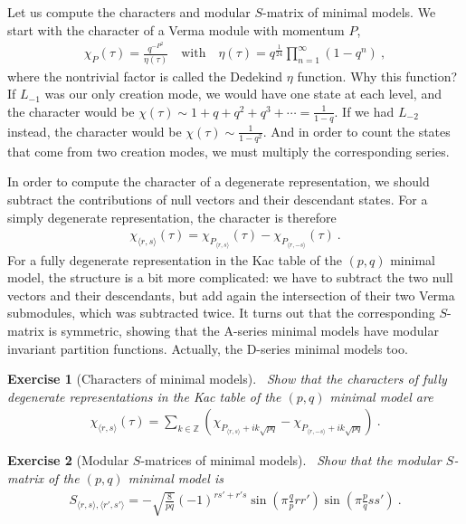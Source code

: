 \documentclass[12pt, a4paper]{article}
\theoremstyle{break}
\newtheorem{exo}{Exercise}[section]
\begin{document}
Let us compute the characters and modular $S$-matrix of minimal models. We start with the character of a Verma module with momentum $P$,
\begin{align}
 \chi_P(\tau) = \frac{q^{-P^2}}{\eta(\tau)} \quad \text{with} \quad \eta(\tau) = q^{\frac{1}{24}} \prod_{n=1}^\infty (1-q^n)\ ,
\end{align}
where the nontrivial factor is called the Dedekind $\eta$ function. Why this function? If $L_{-1}$ was our only creation mode, we would have one state at each level, and the character would be $\chi(\tau)\sim 1+q+q^2+q^3+\cdots = \frac{1}{1-q}$. If we had $L_{-2}$ instead, the character would be $\chi(\tau)\sim \frac{1}{1-q^2}$. And in order to count the states that come from two creation modes, we must multiply the corresponding series.

In order to compute the character of a degenerate representation, we should subtract the contributions of null vectors and their descendant states. For a simply degenerate representation, the character is therefore
\begin{align}
 \chi_{\langle r,s\rangle}(\tau) = \chi_{P_{\langle r,s\rangle}}(\tau) - \chi_{P_{\langle r,-s\rangle}}(\tau)\ .
\end{align}
For a fully degenerate representation in the Kac table of the $(p, q)$ minimal model, the structure is a bit more complicated: we have to subtract the two null vectors and their descendants, but add again the intersection of their two Verma submodules, which was subtracted twice.
It turns out that 
the corresponding $S$-matrix is symmetric, showing that the A-series minimal models have modular invariant partition functions. Actually, the D-series minimal models too. 

\begin{exo}[Characters of minimal models]
 ~\label{exo:chmm}
 Show that the characters of fully degenerate representations in the Kac table of the $(p, q)$ minimal model are
 \begin{align}
 \chi_{\langle r,s\rangle}(\tau) = \sum_{k\in\mathbb{Z}} \left( \chi_{P_{\langle r,s\rangle} + ik\sqrt{pq}} - \chi_{P_{\langle r,-s\rangle} + ik\sqrt{pq}}\right)\ .
 \label{eq:chmm}
\end{align}
\end{exo}

\begin{exo}[Modular $S$-matrices of minimal models]
~\label{exo:mods}
 Show that the modular $S$-matrix of the $(p, q)$ minimal model is 
 \begin{align}
 S_{\langle r,s\rangle, \langle r', s'\rangle} = -\sqrt{\frac{8}{pq}}(-1)^{rs'+r's} \sin\left(\pi\frac{q}{p}rr'\right)\sin\left(\pi\frac{p}{q}ss'\right)\ .
 \label{eq:smm}
\end{align}
\end{exo}
\end{document}
